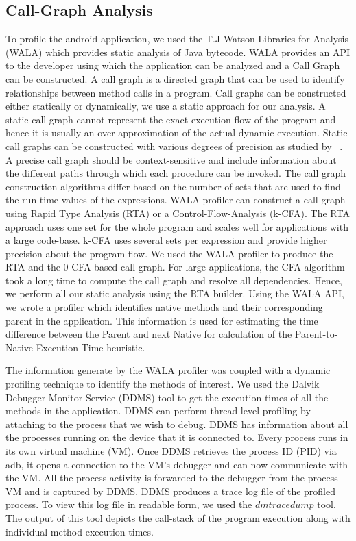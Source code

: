 

\subsection{Call-Graph Analysis}
To profile the android application, we used the T.J Watson Libraries for Analysis (WALA) which provides static analysis
of Java bytecode. WALA provides an API to the developer using which the application can be analyzed and a Call Graph can be
constructed. A call graph is a directed graph that can be used to identify relationships between method calls in a program.
Call graphs can be constructed either statically or dynamically, we use a static approach for our analysis. A static
call graph cannot represent the exact execution flow of the program and hence it is usually an over-approximation of
the actual dynamic execution. Static call graphs can be constructed with various degrees of precision as studied by
~\cite{cgbuild}. A precise call graph should be context-sensitive and include information about the different paths through which
each procedure can be invoked. The call graph construction algorithms differ based on the number of sets that are used to find the
run-time values of the expressions. WALA profiler can construct a call graph using Rapid Type Analysis (RTA) or a Control-Flow-Analysis
(k-CFA). The RTA approach uses one set for the whole program and scales well for applications with a large code-base. k-CFA uses
several sets per expression and provide higher precision about the program flow.
We used the WALA profiler to produce the RTA and the 0-CFA based call graph. For large applications, the CFA algorithm took a long time to
compute the call graph and resolve all dependencies. Hence, we perform all our static analysis using the RTA builder. Using the WALA API,
we wrote a profiler which identifies native methods and their corresponding parent in the application.
This information is used for estimating the time difference between the Parent and next Native for calculation of the Parent-to-Native Execution
Time heuristic.

The information generate by the WALA profiler was coupled with a dynamic profiling technique to identify the methods of interest.
We used the Dalvik Debugger Monitor Service (DDMS) tool to get the execution times of all the methods in the application. DDMS can perform
thread level profiling by attaching to the process that we wish to debug. DDMS has information about all the processes running on the device
that it is connected to. Every process runs in its own virtual machine (VM). Once DDMS retrieves the process ID (PID) via adb, it opens a
connection to the VM's debugger and can now communicate with the VM. All the process activity is forwarded to the debugger from the process VM
and is captured by DDMS. DDMS produces a trace log file of the profiled process. To view this log file in readable form, we used the
$dmtracedump$ tool. The output of this tool depicts the call-stack of the program execution along with individual method execution times.

